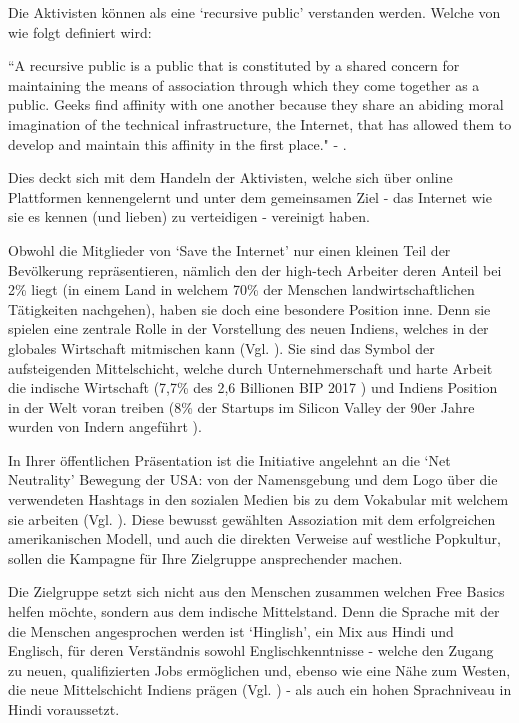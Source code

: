 \documentclass{article}
\begin{document}
\medskip

Die Aktivisten können als eine `recursive public' verstanden werden. Welche von \textcite{twoBits} wie folgt definiert wird:

\medskip

``A recursive public is a public that is constituted by a shared concern for maintaining the means of association through which they come together as a public.
Geeks find affinity with one another because they share an abiding moral imagination of the technical infrastructure, the Internet, that has allowed them to develop and maintain this affinity in the first place." - \cite[28]{twoBits}.

\medskip

Dies deckt sich mit dem Handeln der Aktivisten, welche sich über online Plattformen kennengelernt und unter dem gemeinsamen Ziel - das Internet wie sie es kennen (und lieben) zu verteidigen - vereinigt haben.

\medskip

Obwohl die Mitglieder von `Save the Internet' nur einen kleinen Teil der Bevölkerung repräsentieren, nämlich den der high-tech Arbeiter deren Anteil bei 2\% liegt (in einem Land in welchem 70\% der Menschen landwirtschaftlichen Tätigkeiten nachgehen), haben sie doch eine besondere Position inne. Denn sie spielen eine zentrale Rolle in der Vorstellung des neuen Indiens, welches in der globales Wirtschaft mitmischen kann (Vgl. \cite{thomas2012}).
Sie sind das Symbol der aufsteigenden Mittelschicht, welche durch Unternehmerschaft und harte Arbeit die indische Wirtschaft (7,7\% des 2,6 Billionen BIP 2017 \autocite{statistaIndiaGDP}\autocite{imfIndiaGDP}) und Indiens Position in der Welt voran treiben (8\% der Startups im Silicon Valley der 90er Jahre wurden von Indern angeführt \parencite{upadhya2004}).

\medskip

In Ihrer öffentlichen Präsentation ist die Initiative angelehnt an die `Net Neutrality' Bewegung der USA: von der Namensgebung und dem Logo über die verwendeten Hashtags in den sozialen Medien bis zu dem Vokabular mit welchem sie arbeiten (Vgl. \cite{prasad2017}).
Diese bewusst gewählten Assoziation mit dem erfolgreichen amerikanischen Modell, und auch die direkten Verweise auf westliche Popkultur, sollen die Kampagne für Ihre Zielgruppe ansprechender machen.

Die Zielgruppe setzt sich nicht aus den Menschen zusammen welchen Free Basics helfen möchte, sondern aus dem indische Mittelstand. Denn die Sprache mit der die Menschen angesprochen werden ist `Hinglish', ein Mix aus Hindi und Englisch, für deren Verständnis sowohl Englischkenntnisse - welche den Zugang zu neuen, qualifizierten Jobs ermöglichen und, ebenso wie eine Nähe zum Westen, die neue Mittelschicht Indiens prägen (Vgl. \cite{fernandes2006}) - als auch ein hohen Sprachniveau in Hindi voraussetzt.
\end{document}

